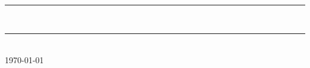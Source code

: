 \thispagestyle{empty}
\begin{center}
    \hspace{0pt}
    \vfill
    \normalsize \textsc{\writeSubject}
    \\ [1.0cm]
    \rule{\linewidth}{0.5pt} \\
    \LARGE \textbf{\uppercase{\writeTitle}}
    \rule{\linewidth}{2pt} \\ [0.5cm]

    \vspace{15px}\normalsize \today

    \vspace{30px}
    {
        \Large
        \printAuthor
    }

    \vfill
    \hspace{0pt}
\end{center}
